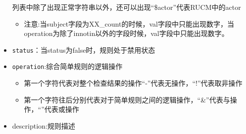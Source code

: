 \begin{itemize}
            列表中除了出现正常字符串以外，还可以出现``\$actor''代表RUCM中的actor

        \begin{itemize}
    \item
    注意:当subject字段为XX\_count的时候，val字段中只能出现数字，当operation为除了innotin以外的字段时候，val字段中只能出现数字。
    \end{itemize}

    \item
    \texttt{status}：当status为false时，规则处于禁用状态
    \item
    \texttt{operation}:综合简单规则的逻辑操作

    \begin{itemize}
    \item
        第一个字符代表对整个检查结果的操作``-''代表无操作，``!''代表取非操作
    \item
        第一个字符往后分别代表对于简单规则之间的逻辑操作，``\&''代表与操作，``\textbar{}''代表或操作
    \end{itemize}
    \item
    description:规则描述
\end{itemize}